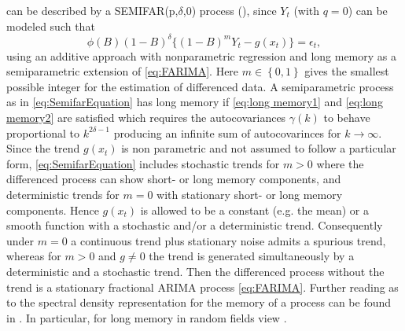 \documentclass[12pt]{article}
\begin{document}
can be described by a SEMIFAR(p,\(\delta\),\(0\)) process (\textcite{beran1998unified,beran2002semifar}), since \(Y_t\) (with \(q = 0\)) can be modeled such that
\begin{equation}
\label{eq:SemifarEquation}
	\phi(B)(1-B)^{\delta} \{(1-B)^m Y_t - g(x_t)\}= \epsilon_t,
\end{equation}
using an additive approach with nonparametric regression and long memory as a semiparametric extension of \eqref{eq:FARIMA}. 
Here \(m \in \left\lbrace 0,1 \right\rbrace \) gives the smallest possible integer for the estimation of differenced data.
%
A semiparametric process as in \eqref{eq:SemifarEquation} has long memory if \eqref{eq:long memory1} and \eqref{eq:long memory2} are satisfied which requires the autocovariances \( \gamma(k) \) to behave proportional to \(k^{2\delta - 1}\) producing an infinite sum of autocovarinces for \(k \rightarrow \infty \). 
Since the trend \( g(x_t) \) is non parametric and not assumed to follow a particular form, \eqref{eq:SemifarEquation} includes stochastic trends for \(m > 0\) where the differenced process can show short- or long memory components, and deterministic trends for \(m = 0\) with stationary short- or long memory components.
Hence \(g(x_t)\) is allowed to be a constant (e.g. the mean) or a smooth function with a stochastic and/or a deterministic trend. 
Consequently under \(m = 0\) a  continuous trend plus stationary noise admits a spurious trend, 
whereas for  \(m > 0\) and \(g \neq 0 \) the trend is generated simultaneously by a deterministic and a stochastic trend. 
Then the differenced process without the trend is a stationary fractional ARIMA process \eqref{eq:FARIMA}. 
Further reading as to the spectral density representation for the memory of a process can be found in \textcite{mandelbrot1983fractal,cox1984review,kunsch1987statistical,hampel1987data,beran1995maximum}. In particular, for long memory in random fields view \textcite{angulo2000estimation,anh1999possible}.\\
\\
\end{document}
